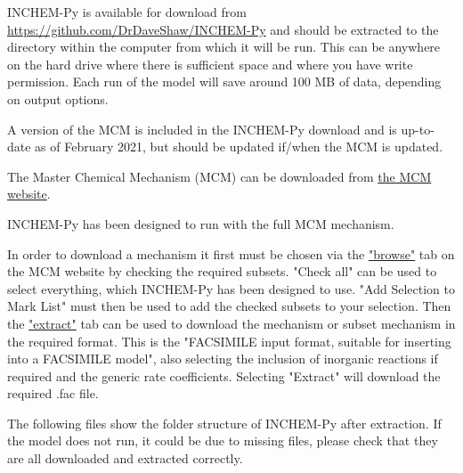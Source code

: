 \documentclass[a4paper]{refart}
\begin{document}

INCHEM-Py is available for download from \url{https://github.com/DrDaveShaw/INCHEM-Py} and should be extracted to the directory within the computer from which it will be run. This can be anywhere on the hard drive where there is sufficient space and where you have write permission. Each run of the model will save around 100 MB of data, depending on output options.


A version of the MCM is included in the INCHEM-Py download and is up-to-date as of February 2021, but should be updated if/when the MCM is updated.

\label{Downloading the MCM}

The Master Chemical Mechanism (MCM) can be downloaded from \href{http://mcm.leeds.ac.uk/MCM/}{the MCM website}.

INCHEM-Py has been designed to run with the full MCM mechanism.

In order to download a mechanism it first must be chosen via the \href{http://mcm.leeds.ac.uk/MCMv3.3.1/roots.htt}{"browse"} tab on the MCM website by checking the required subsets. "Check all" can be used to select everything, which INCHEM-Py has been designed to use. "Add Selection to Mark List" must then be used to add the checked subsets to your selection. Then the \href{http://mcm.leeds.ac.uk/MCMv3.3.1/extract.htt}{"extract"} tab can be used to download the mechanism or subset mechanism in the required format. This is the "FACSIMILE input format, suitable for inserting into a FACSIMILE model", also selecting the inclusion of inorganic reactions if required and the generic rate coefficients. Selecting "Extract" will download the required .fac file.

\newpage
{}

The following files show the folder structure of INCHEM-Py after extraction. If the model does not run, it could be due to missing files, please check that they are all downloaded and extracted correctly.
\end{document}
